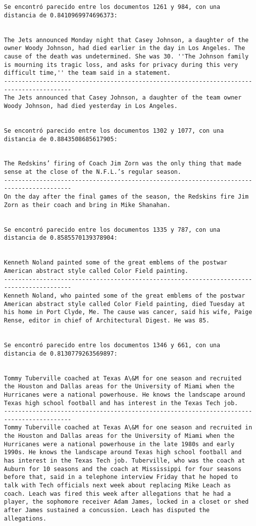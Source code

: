 \documentclass[11pt]{article}
\begin{document}
\begin{Verbatim}[commandchars=\\\{\}]
Se encontró parecido entre los documentos 1261 y 984, con una distancia de 0.8410969974696373:


The Jets announced Monday night that Casey Johnson, a daughter of the owner Woody Johnson, had died earlier in the day in Los Angeles. The cause of the death was undetermined. She was 30. ''The Johnson family is mourning its tragic loss, and asks for privacy during this very difficult time,'' the team said in a statement.
-----------------------------------------------------------------------------------------
The Jets announced that Casey Johnson, a daughter of the team owner Woody Johnson, had died yesterday in Los Angeles.


Se encontró parecido entre los documentos 1302 y 1077, con una distancia de 0.8843508685617905:


The Redskins’ firing of Coach Jim Zorn was the only thing that made sense at the close of the N.F.L.’s regular season.
-----------------------------------------------------------------------------------------
On the day after the final games of the season, the Redskins fire Jim Zorn as their coach and bring in Mike Shanahan.


Se encontró parecido entre los documentos 1335 y 787, con una distancia de 0.8585570139378904:


Kenneth Noland painted some of the great emblems of the postwar American abstract style called Color Field painting.
-----------------------------------------------------------------------------------------
Kenneth Noland, who painted some of the great emblems of the postwar American abstract style called Color Field painting, died Tuesday at his home in Port Clyde, Me. The cause was cancer, said his wife, Paige Rense, editor in chief of Architectural Digest. He was 85.


Se encontró parecido entre los documentos 1346 y 661, con una distancia de 0.8130779263569897:


Tommy Tuberville coached at Texas A\&M for one season and recruited the Houston and Dallas areas for the University of Miami when the Hurricanes were a national powerhouse. He knows the landscape around Texas high school football and has interest in the Texas Tech job.
-----------------------------------------------------------------------------------------
Tommy Tuberville coached at Texas A\&M for one season and recruited in the Houston and Dallas areas for the University of Miami when the Hurricanes were a national powerhouse in the late 1980s and early 1990s. He knows the landscape around Texas high school football and has interest in the Texas Tech job. Tuberville, who was the coach at Auburn for 10 seasons and the coach at Mississippi for four seasons before that, said in a telephone interview Friday that he hoped to talk with Tech officials next week about replacing Mike Leach as coach. Leach was fired this week after allegations that he had a player, the sophomore receiver Adam James, locked in a closet or shed after James sustained a concussion. Leach has disputed the allegations.



\end{Verbatim}
\end{document}
